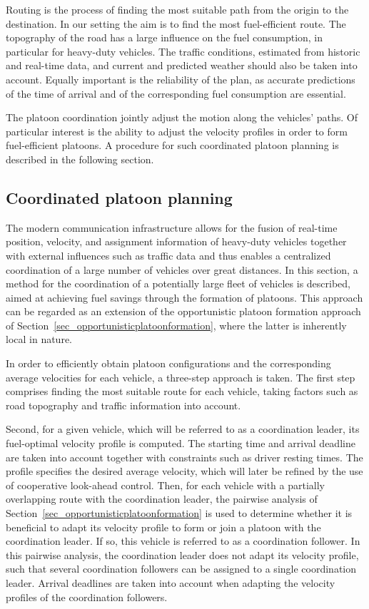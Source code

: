 \documentclass[journal]{IEEEtran}
\begin{document}
Routing is the process of finding the most suitable path from the origin to the destination. In our setting the aim is to find the most fuel-efficient route. The topography of the road has a large influence on the fuel consumption, in particular for heavy-duty vehicles. The traffic conditions, estimated from historic and real-time data, and current and predicted weather should also be taken into account. Equally important is the reliability of the plan, as accurate predictions of the time of arrival and of the corresponding fuel consumption are essential.

The platoon coordination jointly adjust the motion along the vehicles' paths. Of particular interest is the ability to adjust the velocity profiles in order to form fuel-efficient platoons. A procedure for such coordinated platoon planning is described in the following section.


\subsection{Coordinated platoon planning}\label{sec_coordinatedplatoonplanning}
The modern communication infrastructure allows for the fusion of real-time position, velocity, and assignment information of heavy-duty vehicles together with external influences such as traffic data and thus enables a centralized coordination of a large number of vehicles over great distances. In this section, a method for the coordination of a potentially large fleet of vehicles is described, aimed at achieving fuel savings through the formation of platoons.
This approach can be regarded as an extension of the opportunistic platoon formation approach of Section~\ref{sec_opportunisticplatoonformation}, where the latter is inherently local in nature.

In order to efficiently obtain platoon configurations and the corresponding average velocities for each vehicle, a three-step approach is taken. The first step comprises finding the most suitable route for each vehicle, taking factors such as road topography and traffic information into account.

Second, for a given vehicle, which will be referred to as a coordination leader, its fuel-optimal velocity profile is computed. The starting time and arrival deadline are taken into account together with constraints such as driver resting times. The profile specifies the desired average velocity, which will later be refined by the use of cooperative look-ahead control. Then, for each vehicle with a partially overlapping route with the coordination leader, the pairwise analysis of Section~\ref{sec_opportunisticplatoonformation} is used to determine whether it is beneficial to adapt its velocity profile to form or join a platoon with the coordination leader. If so, this vehicle is referred to as a coordination follower. In this pairwise analysis, the coordination leader does not adapt its velocity profile, such that several coordination followers can be assigned to a single coordination leader. Arrival deadlines are taken into account when adapting the velocity profiles of the coordination followers.
\end{document}
